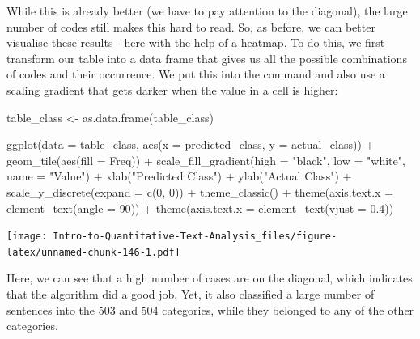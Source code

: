 \documentclass[
]{article}
\newenvironment{Shaded}{\begin{snugshade}}{\end{snugshade}}
\newcommand{\AttributeTok}[1]{\textcolor[rgb]{0.77,0.63,0.00}{#1}}
\newcommand{\DecValTok}[1]{\textcolor[rgb]{0.00,0.00,0.81}{#1}}
\newcommand{\FloatTok}[1]{\textcolor[rgb]{0.00,0.00,0.81}{#1}}
\newcommand{\FunctionTok}[1]{\textcolor[rgb]{0.00,0.00,0.00}{#1}}
\newcommand{\NormalTok}[1]{#1}
\newcommand{\OtherTok}[1]{\textcolor[rgb]{0.56,0.35,0.01}{#1}}
\newcommand{\SpecialCharTok}[1]{\textcolor[rgb]{0.00,0.00,0.00}{#1}}
\newcommand{\StringTok}[1]{\textcolor[rgb]{0.31,0.60,0.02}{#1}}
\begin{document}
While this is already better (we have to pay attention to the diagonal), the large number of codes still makes this hard to read. So, as before, we can better visualise these results - here with the help of a heatmap. To do this, we first transform our table into a data frame that gives us all the possible combinations of codes and their occurrence. We put this into the command and also use a scaling gradient that gets darker when the value in a cell is higher:

\begin{Shaded}
\begin{Highlighting}[]
\NormalTok{table\_class }\OtherTok{\textless{}{-}} \FunctionTok{as.data.frame}\NormalTok{(table\_class)}

\FunctionTok{ggplot}\NormalTok{(}\AttributeTok{data =}\NormalTok{ table\_class, }\FunctionTok{aes}\NormalTok{(}\AttributeTok{x =}\NormalTok{ predicted\_class, }\AttributeTok{y =}\NormalTok{ actual\_class)) }\SpecialCharTok{+}
    \FunctionTok{geom\_tile}\NormalTok{(}\FunctionTok{aes}\NormalTok{(}\AttributeTok{fill =}\NormalTok{ Freq)) }\SpecialCharTok{+} \FunctionTok{scale\_fill\_gradient}\NormalTok{(}\AttributeTok{high =} \StringTok{"black"}\NormalTok{,}
    \AttributeTok{low =} \StringTok{"white"}\NormalTok{, }\AttributeTok{name =} \StringTok{"Value"}\NormalTok{) }\SpecialCharTok{+} \FunctionTok{xlab}\NormalTok{(}\StringTok{"Predicted Class"}\NormalTok{) }\SpecialCharTok{+}
    \FunctionTok{ylab}\NormalTok{(}\StringTok{"Actual Class"}\NormalTok{) }\SpecialCharTok{+} \FunctionTok{scale\_y\_discrete}\NormalTok{(}\AttributeTok{expand =} \FunctionTok{c}\NormalTok{(}\DecValTok{0}\NormalTok{, }\DecValTok{0}\NormalTok{)) }\SpecialCharTok{+}
    \FunctionTok{theme\_classic}\NormalTok{() }\SpecialCharTok{+} \FunctionTok{theme}\NormalTok{(}\AttributeTok{axis.text.x =} \FunctionTok{element\_text}\NormalTok{(}\AttributeTok{angle =} \DecValTok{90}\NormalTok{)) }\SpecialCharTok{+}
    \FunctionTok{theme}\NormalTok{(}\AttributeTok{axis.text.x =} \FunctionTok{element\_text}\NormalTok{(}\AttributeTok{vjust =} \FloatTok{0.4}\NormalTok{))}
\end{Highlighting}
\end{Shaded}

\texttt{[image: Intro-to-Quantitative-Text-Analysis\_files/figure-latex/unnamed-chunk-146-1.pdf]}

Here, we can see that a high number of cases are on the diagonal, which indicates that the algorithm did a good job. Yet, it also classified a large number of sentences into the 503 and 504 categories, while they belonged to any of the other categories.
\end{document}

